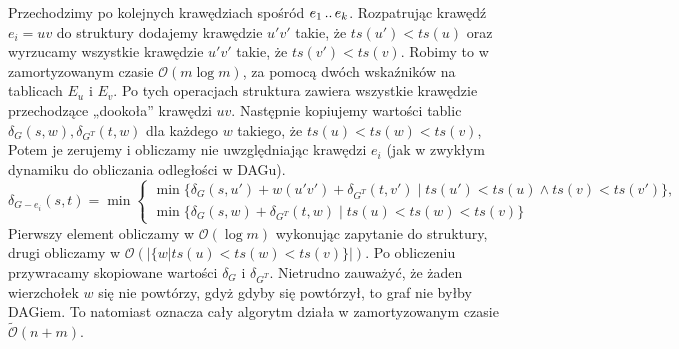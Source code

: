 \documentclass[11pt]{article}
\newcommand{\dd}{\mathinner{{\ldotp}{\ldotp}}}
\newcommand{\quasiLinear}[1]{\widetilde{\mathcal{O}}\left(#1\right)}
\begin{document}
Przechodzimy po kolejnych krawędziach spośród $e_1 \dd e_k$. Rozpatrując
krawędź $e_i=uv$ do struktury dodajemy krawędzie $u'v'$ takie, że $ts(u') <
ts(u)$ oraz wyrzucamy wszystkie krawędzie $u'v'$ takie, że
$ts(v') < ts(v)$. Robimy to w zamortyzowanym czasie $\mathcal{O}(m
\log m)$, za pomocą dwóch wskaźników na tablicach $E_u$ i $E_v$. Po tych
operacjach struktura zawiera wszystkie krawędzie przechodzące „dookoła''
krawędzi $uv$. Następnie kopiujemy wartości tablic $\delta_{G}(s,w),
\delta_{G^T}(t,w)$ dla każdego $w$ takiego, że $ts(u) < ts(w) <
ts(v)$, Potem je zerujemy i obliczamy nie uwzględniając krawędzi $e_i$ (jak w
zwykłym dynamiku do obliczania odległości w DAGu).
\[
\delta_{G-e_i}(s,t) =
\min \left\{
    \begin{array}{l}
        \displaystyle \min \big\{ \delta_{G}(s,u') + w(u'v') + \delta_{G^T}(t,v') \;\big|\; ts(u') < ts(u) \land ts(v) < ts(v') \big\}, \\[1.2em]
        \displaystyle \min \big\{ \delta_{G}(s,w) + \delta_{G^T}(t,w) \;\big|\; ts(u) < ts(w) < ts(v) \big\}
    \end{array}
\right.
\]
Pierwszy element obliczamy w $\mathcal{O}(\log m)$ wykonując zapytanie do
struktury, drugi obliczamy w $\mathcal{O}(|\{ w \big| ts(u) < ts(w) < ts(v)\}|)$.
Po obliczeniu przywracamy skopiowane wartości $\delta_G$ i $\delta_{G^T}$.
Nietrudno zauważyć, że żaden wierzchołek $w$ się nie powtórzy, gdyż gdyby się
powtórzył, to graf nie byłby DAGiem. To natomiast oznacza cały algorytm działa
w zamortyzowanym czasie $\quasiLinear{n+m}$.
\end{document}
